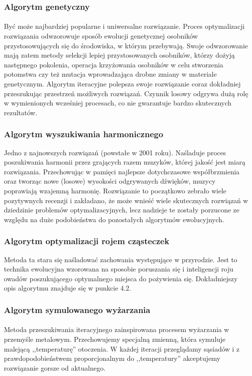 \subsubsection{Algorytm genetyczny}
\paragraph{} Być może najbardziej popularne i uniwersalne rozwiązanie. Proces optymalizacji rozwiązania odwzorowuje sposób ewolucji genetycznej osobników przystosowujących się do środowiska, w którym przebywają. Swoje odwzorowanie mają zatem metody selekcji lepiej przystosowanych osobników, którzy dożyją następnego pokolenia, operacja krzyżowania osobników w celu stworzenia potomstwa czy też mutacja wprowadzająca drobne zmiany w materiale genetycznym. Algorytm iteracyjne polepsza swoje rozwiązanie coraz dokładniej przeszukując przestrzeń możliwych rozwiązań. Czynnik losowy odgrywa dużą rolę w wymienionych wcześniej procesach, co nie gwarantuje bardzo skutecznych rezultatów.
\subsubsection{Algorytm wyszukiwania harmonicznego}
Jedno z najnowszych rozwiązań (powstałe w 2001 roku). Naśladuje proces poszukiwania harmonii przez grających razem muzyków, której jakość jest miarą rozwiązania. Przechowując w pamięci najlepsze dotychczasowe współbrzmienia oraz tworząc nowe (losowe) wysokości odgrywanych dźwięków, muzycy poprawiają wzajemną harmonię. Rozwiązanie to początkowo zebrało wiele pozytywnych recenzji i zakładano, że może wnieść wiele skutecznych rozwiązań w dziedzinie problemów optymalizacyjnych, lecz nadzieje te zostały porzucone ze względu na duże podobieństwa do pozostałych algorytmów ewolucyjnych.
\subsubsection{Algorytm optymalizacji rojem cząsteczek}
Metoda ta stara się naśladować zachowania występujące w przyrodzie. Jest to technika ewolucyjna wzorowana na sposobie poruszania się i inteligencji roju owadów poszukującego optymalnego miejsca do pożywienia się. Dokładniejszy opis algorytmu znajduje się w punkcie 4.2.

\subsubsection{Algorytm symulowanego wyżarzania}
\paragraph{} Metoda przeszukiwania iteracyjnego zainspirowana procesem wyżarzania w przemyśle metalowym. Przechowujemy specjalną zmienną, która symuluje malejącą ,,temperaturę'' otoczenia. W każdej iteracji przeglądamy sąsiadów i z prawdopodobieństwem proporcjonalnym do ,,temperatury'' akceptujemy rozwiązanie gorsze od aktualnego.



